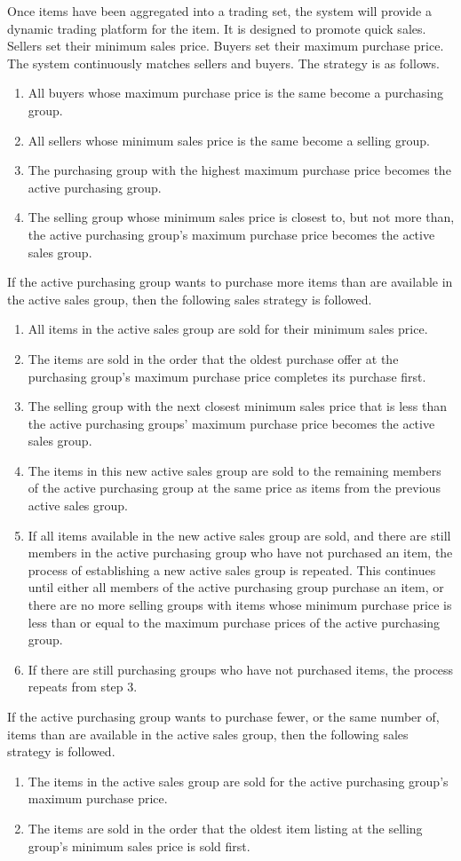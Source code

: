 \documentclass{csse4400}
\begin{document}
Once items have been aggregated into a trading set, the system will provide a dynamic trading platform for the item.
It is designed to promote quick sales.
Sellers set their minimum sales price.
Buyers set their maximum purchase price.
The system continuously matches sellers and buyers.
The strategy is as follows.
\begin{enumerate}
	\item All buyers whose maximum purchase price is the same become a purchasing group.
	\item All sellers whose minimum sales price is the same become a selling group.
	\item The purchasing group with the highest maximum purchase price becomes the active purchasing group.
	\item The selling group whose minimum sales price is closest to, but not more than, the active purchasing group's maximum purchase price becomes the active sales group.
\end{enumerate}
If the active purchasing group wants to purchase more items than are available in the active sales group, then the following sales strategy is followed.
\begin{enumerate}
	\item All items in the active sales group are sold for their minimum sales price.
	\item The items are sold in the order that the oldest purchase offer at the purchasing group's maximum purchase price completes its purchase first.
	\item The selling group with the next closest minimum sales price that is less than the active purchasing groups' maximum purchase price becomes the active sales group.
	\item The items in this new active sales group are sold to the remaining members of the active purchasing group at the same price as items from the previous active sales group.
	\item If all items available in the new active sales group are sold, and there are still members in the active purchasing group who have not purchased an item, the process of establishing a new active sales group is repeated. This continues until either all members of the active purchasing group purchase an item, or there are no more selling groups with items whose minimum purchase price is less than or equal to the maximum purchase prices of the active purchasing group.
	\item If there are still purchasing groups who have not purchased items, the process repeats from step 3.
\end{enumerate}
If the active purchasing group wants to purchase fewer, or the same number of, items than are available in the active sales group, then the following sales strategy is followed.
\begin{enumerate}
	\item The items in the active sales group are sold for the active purchasing group's maximum purchase price.
	\item The items are sold in the order that the oldest item listing at the selling group's minimum sales price is sold first.
\end{enumerate}
\end{document}

